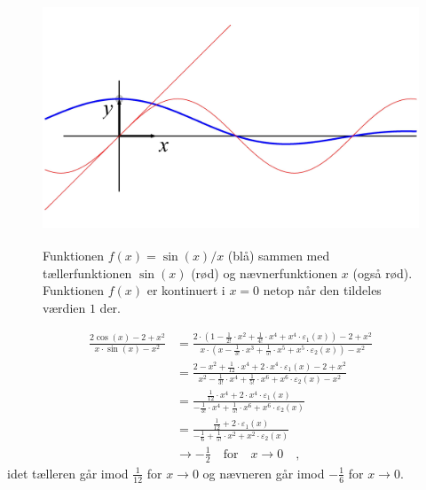 \begin{figure}[ht]
\centerline{ \includegraphics[height=75mm]{plotsinxdivx.pdf}}
\begin{center}
\caption{Funktionen $f(x)=\sin(x)/x$ (blå) sammen med tællerfunktionen $\sin(x)$ (rød) og nævnerfunktionen $x$ (også rød). Funktionen $f(x)$ er kontinuert i $x=0$ netop når den tildeles værdien $1$ der.} \label{figsinxdivx}
\end{center}
\end{figure}


\begin{example}
\begin{equation}
\begin{aligned}
\frac{2\cos(x) - 2 + x^{2}}{x\cdot\sin(x) - x^{2}} &= \frac{2\cdot(1 - \frac{1}{2!}\cdot x^{2} + \frac{1}{4!}\cdot x^{4} + x^{4}\cdot\varepsilon_{1}(x)) - 2 + x^{2}}{x\cdot(x-\frac{1}{3!}\cdot x^{3} + \frac{1}{5!}\cdot x^{5} + x^{5}\cdot \varepsilon_{2}(x) ) - x^{2}} \\
&=\frac{2 -  x^{2} + \frac{1}{12}\cdot x^{4} + 2\cdot x^{4}\cdot\varepsilon_{1}(x) - 2 + x^{2}}{x^{2} -\frac{1}{3!}\cdot x^{4} + \frac{1}{5!}\cdot x^{6} + x^{6}\cdot \varepsilon_{2}(x)  - x^{2}} \\
&=\frac{\frac{1}{12}\cdot x^{4} + 2\cdot x^{4}\cdot\varepsilon_{1}(x)}{-\frac{1}{3!}\cdot x^{4} + \frac{1}{5!}\cdot x^{6} + x^{6}\cdot \varepsilon_{2}(x) }\\
&=\frac{\frac{1}{12} + 2\cdot \varepsilon_{1}(x)}{-\frac{1}{6} + \frac{1}{5!}\cdot x^{2} + x^{2}\cdot \varepsilon_{2}(x) } \\
& \to -\frac{1}{2} \quad \textrm{for} \quad x \to 0 \quad ,
\end{aligned}
\end{equation}
idet tælleren går imod $\frac{1}{12}$ for $ x \to 0 $ og nævneren går imod $-\frac{1}{6}$ for $ x \to 0 $.
\end{example}

